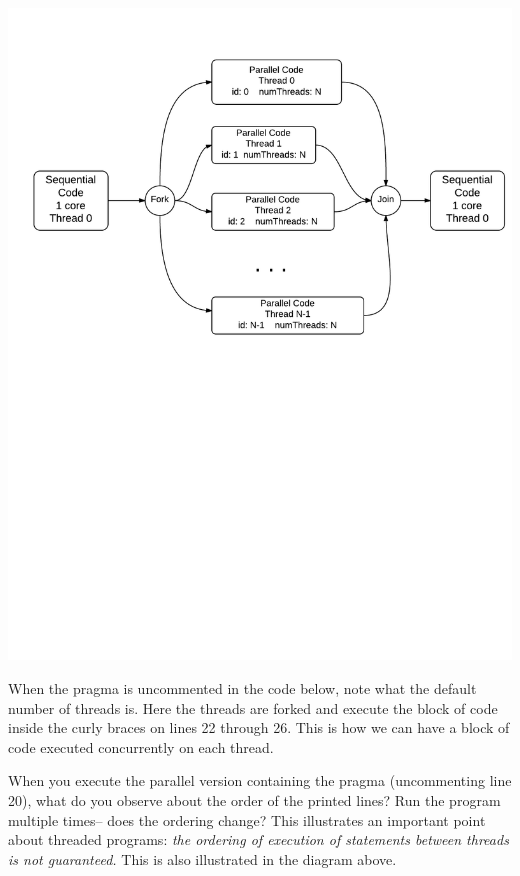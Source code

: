 \documentclass[letterpaper,10pt,openany,oneside]{sphinxmanual}
\begin{document}
\includegraphics{ForkJoin_SPMD.png}

When the pragma is uncommented in the code below, note what the default number of threads
is.  Here the threads are forked and execute the block of code inside the
curly braces on lines 22 through 26.  This is how we can have a block of code executed
concurrently on each thread.

When you execute the parallel version containing the pragma (uncommenting line 20),
what do you observe about the order of the printed lines?  Run the program multiple times--
does the ordering change?  This illustrates an important point about threaded programs:
\emph{the ordering of execution of statements between threads is not guaranteed.}  This is also
illustrated in the diagram above.
\end{document}
